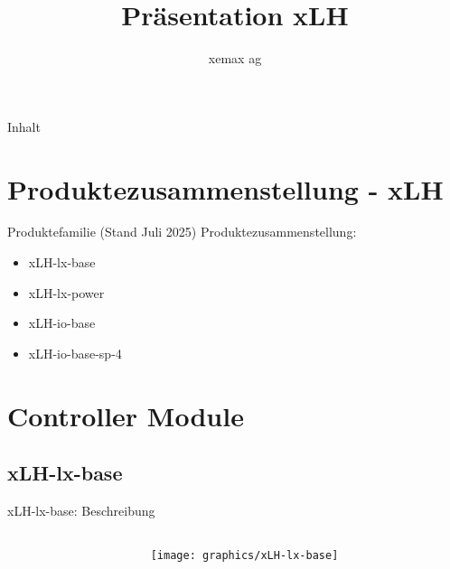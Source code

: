 \documentclass[10pt]{beamer}
\title{Präsentation xLH
\\ \vspace{0.5cm}}
\author{xemax ag}
\begin{document}
    \begin{frame}
        \titlepage
    \end{frame}

    \begin{frame}{Inhalt}
      \tableofcontents
    \end{frame}

    \section{Produktezusammenstellung - xLH}
        \begin{frame}{Produktefamilie (Stand Juli 2025)}
            Produktezusammenstellung:
            \begin{itemize}
                \item xLH-lx-base
                \item xLH-lx-power
                \item xLH-io-base
                \item xLH-io-base-sp-4
            \end{itemize}
        \end{frame}

    \section{Controller Module}
        \subsection{xLH-lx-base}
            \begin{frame}{xLH-lx-base: Beschreibung}
                \begin{columns}
                    \begin{column}{0.75\textwidth}
                        
                    \end{column}
                    \begin{column}{0.25\textwidth}
                        \begin{figure}[h]
                            \centering
                            \texttt{[image: graphics/xLH-lx-base]}
                        \end{figure}
                    \end{column}
                \end{columns}
            \end{frame}
\end{document}
